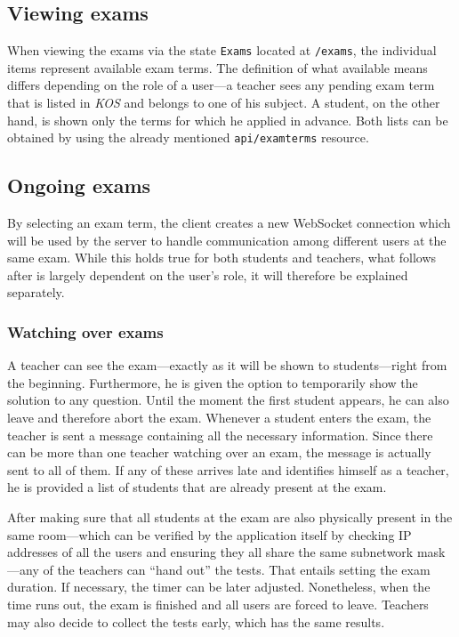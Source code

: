 \documentclass[thesis=M,english,hidelinks]{FITthesis}[2012/10/20]
\newcommand{\code}{\texttt}
\begin{document}
    \subsection{Viewing exams}

When viewing the exams via the state \code{Exams} located at \code{/exams}, the individual items represent available exam terms. The definition of what available means differs depending on the role of a user---a teacher sees any pending exam term that is listed in \textit{KOS} and belongs to one of his subject. A student, on the other hand, is shown only the terms for which he applied in advance. Both lists can be obtained by using the already mentioned \code{api/examterms} resource.

    \subsection{Ongoing exams}

By selecting an exam term, the client creates a new WebSocket connection which will be used by the server to handle communication among different users at the same exam. While this holds true for both students and teachers, what follows after is largely dependent on the user's role, it will therefore be explained separately.

      \subsubsection{Watching over exams}

A teacher can see the exam---exactly as it will be shown to students---right from the beginning. Furthermore, he is given the option to temporarily show the solution to any question. Until the moment the first student appears, he can also leave and therefore abort the exam. Whenever a student enters the exam, the teacher is sent a message containing all the necessary information. Since there can be more than one teacher watching over an exam, the message is actually sent to all of them. If any of these arrives late and identifies himself as a teacher, he is provided a list of students that are already present at the exam.

After making sure that all students at the exam are also physically present in the same room---which can be verified by the application itself by checking IP addresses of all the users and ensuring they all share the same subnetwork mask---any of the teachers can ``hand out'' the tests. That entails setting the exam duration. If necessary, the timer can be later adjusted. Nonetheless, when the time runs out, the exam is finished and all users are forced to leave.
Teachers may also decide to collect the tests early, which has the same results.
\end{document}
